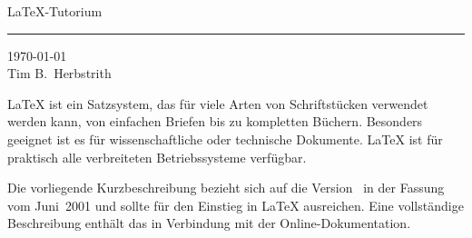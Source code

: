 
\begin{titlepage}
\renewcommand{\thefootnote}{\fnsymbol{footnote}}
{\Huge%
\selectfont
\raggedright
\LaTeX-Tutorium
\rule{\textwidth}{0.75pt}
\par
}
\begin{flushleft}
  \normalsize
  \selectfont
  \today\\[2ex]
  Tim B.~Herbstrith
\end{flushleft}

\vfill

{\parindent=0cm
\LaTeX{} ist ein Satzsystem, das für viele Arten von
Schriftstücken verwendet werden kann, von einfachen Briefen bis zu
kompletten Büchern.  Besonders geeignet ist es für 
wissenschaftliche oder technische Dokumente. \LaTeX{} ist für 
praktisch alle verbreiteten Betriebssysteme verfügbar.
 
Die vorliegende Kurzbeschreibung bezieht sich auf die Version
\LaTeXe\ in der Fassung vom Juni~2001 und sollte für den 
Einstieg in \LaTeX{} ausreichen.  
Eine vollständige Beschreibung enthält das \manual{}
in Verbindung mit der Online-Dokumentation.
}
\setcounter{footnote}{0}
\end{titlepage}


